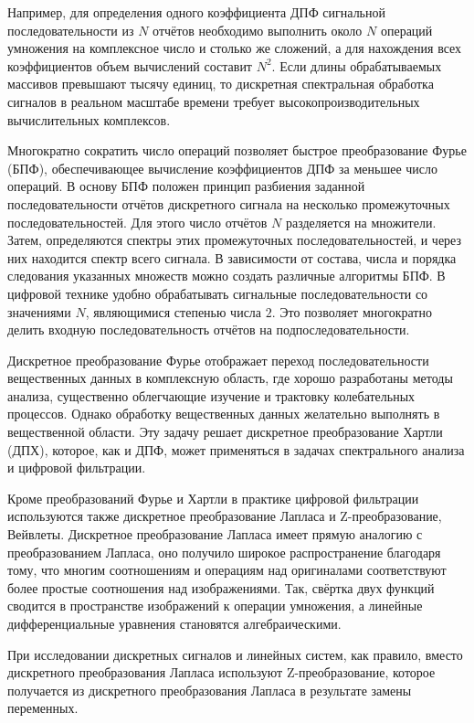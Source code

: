 \documentclass[a4paper, 14pt, titlepage]{extarticle}
\begin{document}
  Например, для определения одного коэффициента ДПФ сигнальной последовательности из $N$ отчётов
  необходимо выполнить около $N$ операций умножения на комплексное число и столько же сложений, а для
  нахождения всех коэффициентов объем вычислений составит $N^2$. Если длины обрабатываемых массивов
  превышают тысячу единиц, то дискретная спектральная обработка сигналов в реальном масштабе времени
  требует высокопроизводительных вычислительных комплексов.

  Многократно сократить число операций позволяет быстрое преобразование Фурье (БПФ), обеспечивающее
  вычисление коэффициентов ДПФ за меньшее число операций. В основу БПФ положен принцип разбиения
  заданной последовательности отчётов дискретного сигнала на несколько промежуточных
  последовательностей. Для этого число отчётов $N$ разделяется на множители. Затем, определяются
  спектры этих промежуточных последовательностей, и через них находится спектр всего сигнала. В
  зависимости от состава, числа и порядка следования указанных множеств можно создать различные
  алгоритмы БПФ. В цифровой технике удобно обрабатывать сигнальные последовательности со значениями
  $N$, являющимися степенью числа $2$. Это позволяет многократно делить входную
  последовательность отчётов на подпоследовательности.

  Дискретное преобразование Фурье отображает переход последовательности вещественных данных в
  комплексную область, где хорошо разработаны методы анализа, существенно облегчающие изучение и
  трактовку колебательных процессов. Однако обработку вещественных данных желательно выполнять в
  вещественной области. Эту задачу решает дискретное преобразование Хартли (ДПХ), которое, как и
  ДПФ, может применяться в задачах спектрального анализа и цифровой фильтрации.

  Кроме преобразований Фурье и Хартли в практике цифровой фильтрации используются также дискретное
  преобразование Лапласа и Z-пре\-об\-ра\-зо\-ва\-ние, Вейвлеты. Дискретное преобразование Лапласа имеет
  прямую аналогию с преобразованием Лапласа, оно получило широкое распространение благодаря тому, что
  многим соотношениям и операциям над оригиналами соответствуют более простые соотношения над
  изображениями. Так, свёртка двух функций сводится в пространстве изображений к операции умножения,
  а линейные дифференциальные уравнения становятся алгебраическими.

  При исследовании дискретных сигналов и линейных систем, как правило, вместо дискретного
  преобразования Лапласа используют Z-пре\-об\-ра\-зо\-ва\-ние, которое получается из дискретного
  преобразования Лапласа в результате замены переменных.
\end{document}
